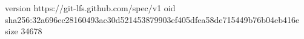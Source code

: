 version https://git-lfs.github.com/spec/v1
oid sha256:32a696ec28160493ac30d521453879903ef405dfea58de715449b76b04eb416e
size 34678
